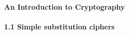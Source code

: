 \documentclass[12pt,a4paper]{article}
\begin{document}
\begin{flushleft}

\textbf{An Introduction to Cryptography\\}
~\\
\textbf{1.1 Simple substitution ciphers\\}


\end{flushleft}
\end{document}

